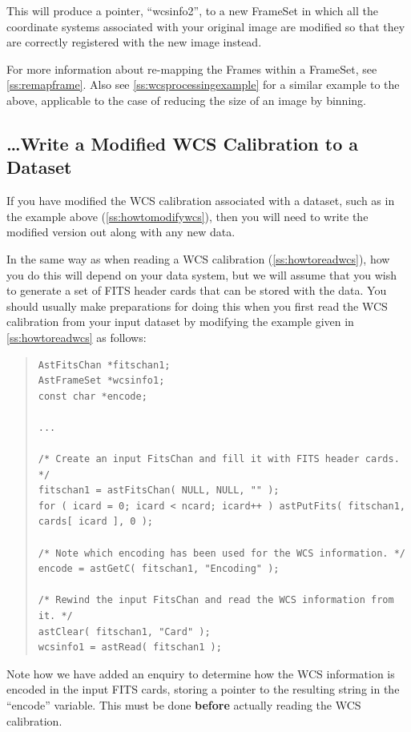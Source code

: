\documentclass[twoside,11pt]{article}
\newcommand{\secref}[1]{\S\ref{#1}}
\renewcommand{\secref}[1]{\ref{#1}}
\begin{document}
This will produce a pointer, ``wcsinfo2'', to a new FrameSet in which
all the coordinate systems associated with your original image are
modified so that they are correctly registered with the new image
instead.

For more information about re-mapping the Frames within a FrameSet,
see \secref{ss:remapframe}. Also see \secref{ss:wcsprocessingexample}
for a similar example to the above, applicable to the case of reducing
the size of an image by binning.

\subsection{\ldots Write a Modified WCS Calibration to a Dataset}

If you have modified the WCS calibration associated with a dataset,
such as in the example above (\secref{ss:howtomodifywcs}), then you
will need to write the modified version out along with any new data.

In the same way as when reading a WCS calibration
(\secref{ss:howtoreadwcs}), how you do this will depend on your data
system, but we will assume that you wish to generate a set of FITS
header cards that can be stored with the data. You should usually make
preparations for doing this when you first read the WCS calibration
from your input dataset by modifying the example given in
\secref{ss:howtoreadwcs} as follows:

\begin{quote}
\small
\begin{verbatim}
AstFitsChan *fitschan1;
AstFrameSet *wcsinfo1;
const char *encode;

...

/* Create an input FitsChan and fill it with FITS header cards. */
fitschan1 = astFitsChan( NULL, NULL, "" );
for ( icard = 0; icard < ncard; icard++ ) astPutFits( fitschan1, cards[ icard ], 0 );

/* Note which encoding has been used for the WCS information. */
encode = astGetC( fitschan1, "Encoding" );

/* Rewind the input FitsChan and read the WCS information from it. */
astClear( fitschan1, "Card" );
wcsinfo1 = astRead( fitschan1 );
\end{verbatim}
\normalsize
\end{quote}

Note how we have added an enquiry to determine how the WCS information
is encoded in the input FITS cards, storing a pointer to the resulting
string in the ``encode'' variable. This must be done {\bf{before}}
actually reading the WCS calibration.
\end{document}

